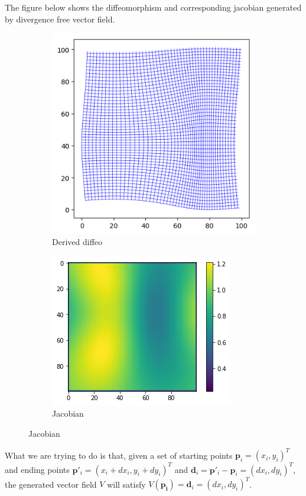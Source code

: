 \documentclass{article}
\theoremstyle{definition}
\theoremstyle{plain}
\begin{document}
The figure below shows the diffeomorphism and corresponding jacobian generated by divergence free vector field.
\begin{figure}[H]
    \centering
    \begin{subfigure}[t]{0.45\textwidth}
         \centering
         \includegraphics[scale=0.42]{figure/divfree.png}
         \caption{Derived diffeo}
     \end{subfigure}
     \begin{subfigure}[t]{0.45\textwidth}
         \centering
         \includegraphics[scale=0.5]{figure/divfree_jacobian.png}
         \caption{Jacobian}
     \end{subfigure}
\end{figure}

What we are trying to do is that, given a set of starting points $\mathbf{p}_i=(x_i,y_i)^T$ and ending points $\mathbf{p}'_i=(x_i+dx_i,y_i+dy_i)^T$ and $\mathbf{d}_i=\mathbf{p}'_i-\mathbf{p}_i=(dx_i,dy_i)^T$, the generated vector field $V$ will satisfy $V(\mathbf{p_i})=\mathbf{d}_i=(dx_i,dy_i)^T$. 
\end{document}

